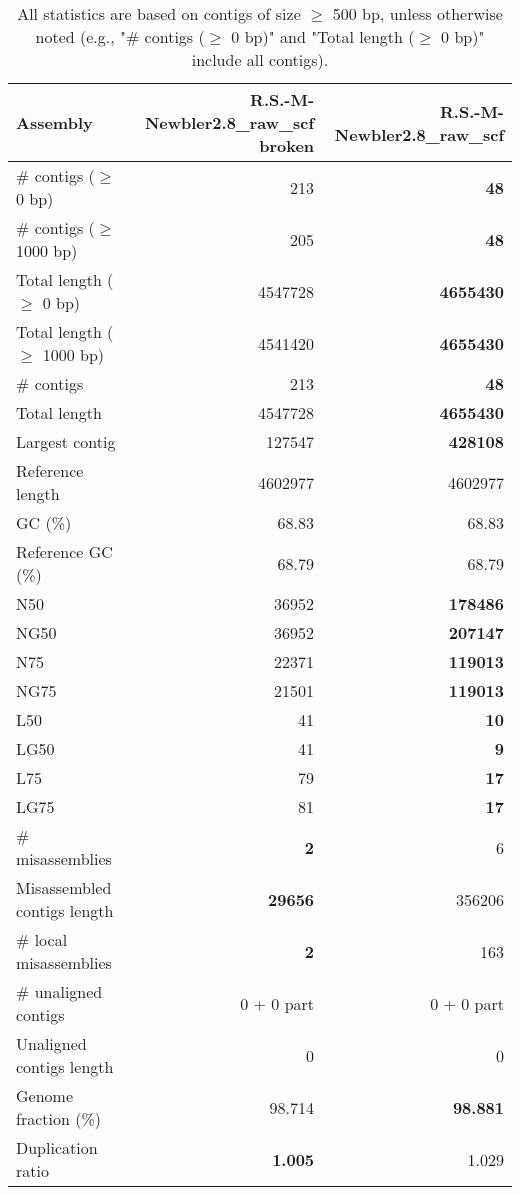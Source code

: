 \documentclass[12pt,a4paper]{article}
\begin{document}
\begin{table}[ht]
\begin{center}
\caption{All statistics are based on contigs of size $\geq$ 500 bp, unless otherwise noted (e.g., "\# contigs ($\geq$ 0 bp)" and "Total length ($\geq$ 0 bp)" include all contigs).}
\begin{tabular}{|l*{2}{|r}|}
\hline
Assembly & R.S.-M-Newbler2.8\_raw\_scf broken & R.S.-M-Newbler2.8\_raw\_scf \\ \hline
\# contigs ($\geq$ 0 bp) & 213 & {\bf 48} \\ \hline
\# contigs ($\geq$ 1000 bp) & 205 & {\bf 48} \\ \hline
Total length ($\geq$ 0 bp) & 4547728 & {\bf 4655430} \\ \hline
Total length ($\geq$ 1000 bp) & 4541420 & {\bf 4655430} \\ \hline
\# contigs & 213 & {\bf 48} \\ \hline
Total length & 4547728 & {\bf 4655430} \\ \hline
Largest contig & 127547 & {\bf 428108} \\ \hline
Reference length & 4602977 & 4602977 \\ \hline
GC (\%) & 68.83 & 68.83 \\ \hline
Reference GC (\%) & 68.79 & 68.79 \\ \hline
N50 & 36952 & {\bf 178486} \\ \hline
NG50 & 36952 & {\bf 207147} \\ \hline
N75 & 22371 & {\bf 119013} \\ \hline
NG75 & 21501 & {\bf 119013} \\ \hline
L50 & 41 & {\bf 10} \\ \hline
LG50 & 41 & {\bf 9} \\ \hline
L75 & 79 & {\bf 17} \\ \hline
LG75 & 81 & {\bf 17} \\ \hline
\# misassemblies & {\bf 2} & 6 \\ \hline
Misassembled contigs length & {\bf 29656} & 356206 \\ \hline
\# local misassemblies & {\bf 2} & 163 \\ \hline
\# unaligned contigs & 0 + 0 part & 0 + 0 part \\ \hline
Unaligned contigs length & 0 & 0 \\ \hline
Genome fraction (\%) & 98.714 & {\bf 98.881} \\ \hline
Duplication ratio & {\bf 1.005} & 1.029 \\ \hline

\end{tabular}
\end{center}
\end{table}
\end{document}
